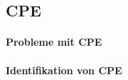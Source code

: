 
\subsection{CPE}


\paragraph{Probleme mit CPE}


\paragraph{Identifikation von CPE}\label{par:automated-cpe-identification}

